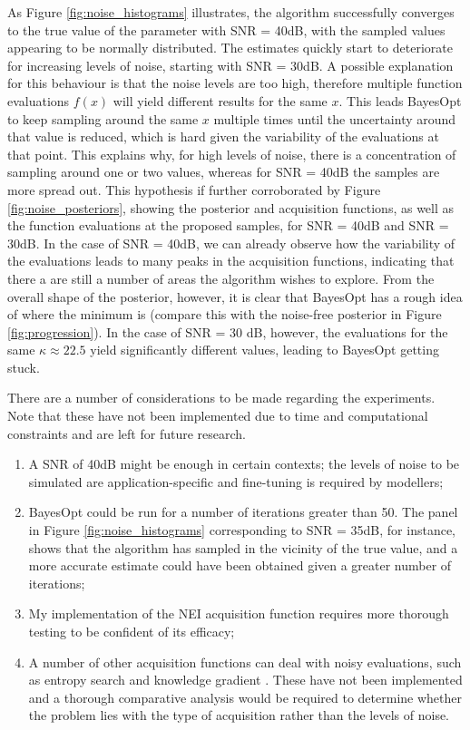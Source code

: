 \documentclass[bsc,frontabs,singlespacing,parskip,deptreport]{infthesis}
\begin{document}
As Figure \ref{fig:noise_histograms} illustrates, the algorithm successfully converges to the true value of the parameter with SNR = 40dB, with the sampled values appearing to be normally distributed. The estimates quickly start to deteriorate for increasing levels of noise, starting with SNR = 30dB. A possible explanation for this behaviour is that the noise levels are too high, therefore multiple function evaluations $f(x)$ will yield different results for the same $x$. This leads BayesOpt to keep sampling around the same $x$ multiple times until the uncertainty around that value is reduced, which is hard given the variability of the evaluations at that point. This explains why, for high levels of noise, there is a concentration of sampling around one or two values, whereas for SNR = 40dB the samples are more spread out. This hypothesis if further corroborated by Figure \ref{fig:noise_posteriors}, showing the posterior and acquisition functions, as well as the function evaluations at the proposed samples, for SNR = 40dB and SNR = 30dB. In the case of SNR = 40dB, we can already observe how the variability of the evaluations leads to many peaks in the acquisition functions, indicating that there a are still a number of areas the algorithm wishes to explore. From the overall shape of the posterior, however, it is clear that BayesOpt has a rough idea of where the minimum is (compare this with the noise-free posterior in Figure \ref{fig:progression}). In the case of SNR = 30 dB, however, the evaluations for the same $\kappa \approx 22.5$ yield significantly different values, leading to BayesOpt getting stuck.

There are a number of considerations to be made regarding the experiments. Note that these have not been implemented due to time and computational constraints and are left for future research.

\begin{enumerate}
    \item A SNR of 40dB might be enough in certain contexts; the levels of noise to be simulated are application-specific and fine-tuning is required by modellers;
    \item BayesOpt could be run for a number of iterations greater than 50. The panel in Figure \ref{fig:noise_histograms} corresponding to SNR = 35dB, for instance, shows that the algorithm has sampled in the vicinity of the true value, and a more accurate estimate could have been obtained given a greater number of iterations;
    \item My implementation of the NEI acquisition function requires more thorough testing to be confident of its efficacy;
    \item A number of other acquisition functions can deal with noisy evaluations, such as entropy search \cite{10.5555/2188385.2343701} and knowledge gradient \cite{doi:10.1137/100801275}. These have not been implemented and a thorough comparative analysis would be required to determine whether the problem lies with the type of acquisition rather than the levels of noise. 
\end{enumerate}
\end{document}
